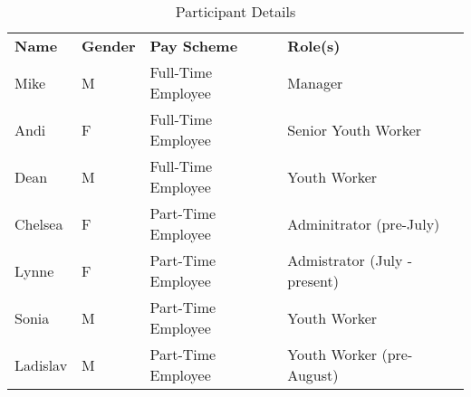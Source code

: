 
\begin{table}
  \begin{tabular}{llll}
    \textbf{Name} & \textbf{Gender} & \textbf{Pay Scheme} & \textbf{Role(s)} \\
    Mike & M & Full-Time Employee & Manager \\
    Andi & F & Full-Time Employee & Senior Youth Worker\\
    Dean & M & Full-Time Employee & Youth Worker\\
    Chelsea & F & Part-Time Employee & Adminitrator (pre-July)\\
    Lynne & F & Part-Time Employee & Admistrator (July - present)\\
    Sonia & M & Part-Time Employee & Youth Worker\\
    Ladislav & M & Part-Time Employee & Youth Worker (pre-August) \\
  \end{tabular}
  \caption{Participant Details}
  \label{tab:participant}

\end{table}

